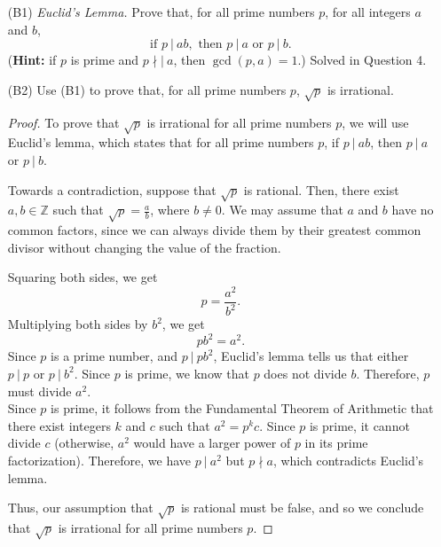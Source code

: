\documentclass{article}
\begin{document}
    \begin{itemize}

    	\item [(B1)] \emph{Euclid's Lemma.} Prove that, for all prime numbers $p$, for all integers $a$ and $b$,
    		\[
    			\text{if } p\ |\ ab, \text{ then } p\ |\ a \text{ or } p\ |\ b.
    		\]
    		(\textbf{Hint:} if $p$ is prime and $p\nmid|\ a$, then $\gcd(p,a) = 1$.)
                \ppar Solved in Question 4.

    	\item [(B2)] Use (B1) to prove that, for all prime numbers $p$, $\sqrt{p}$ is irrational.
                \begin{proof}
                    To prove that $\sqrt{p}$ is irrational for all prime numbers $p$, we will use Euclid's lemma, which states that for all prime numbers $p$, if $p\ |\ ab$, then $p\ |\ a$ or $p\ |\ b$.

                    Towards a contradiction, suppose that $\sqrt{p}$ is rational. Then, there exist $a, b\in\mathbb{Z}$ such that $\sqrt{p}=\frac{a}{b}$, where $b\neq0$. We may assume that $a$ and $b$ have no common factors, since we can always divide them by their greatest common divisor without changing the value of the fraction.

                    Squaring both sides, we get 
                    \[
                        p = \frac{a^2}{b^2}.
                    \]
                    Multiplying both sides by $b^2$, we get
                    \[
                        pb^2 = a^2.
                    \]
                    Since $p$ is a prime number, and $p\ |\ pb^2$, Euclid's lemma tells us that either $p\ |\ p$ or $p\ |\ b^2$. Since $p$ is prime, we know that $p$ does not divide $b$. Therefore, $p$ must divide $a^2$.\\

                    Since $p$ is prime, it follows from the Fundamental Theorem of Arithmetic that there exist integers $k$ and $c$ such that $a^2 = p^kc$. Since $p$ is prime, it cannot divide $c$ (otherwise, $a^2$ would have a larger power of $p$ in its prime factorization). Therefore, we have $p\ |\ a^2$ but $p\nmid a$, which contradicts Euclid's lemma.

Thus, our assumption that $\sqrt{p}$ is rational must be false, and so we conclude that $\sqrt{p}$ is irrational for all prime numbers $p$.
                \end{proof}
    \end{itemize}
    
\end{document}

